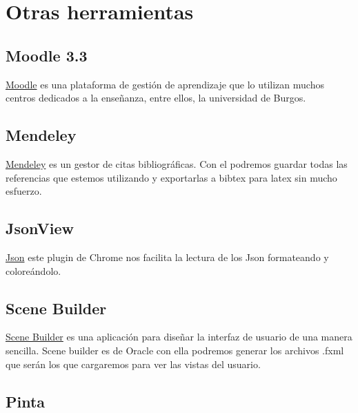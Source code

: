 

\section{Otras herramientas}\label{otras-herramientas}

\subsection{Moodle 3.3}\label{moodle}

\href{https://moodle.org/?lang=es}{Moodle} es una plataforma de gestión de aprendizaje que lo utilizan muchos centros dedicados a la enseñanza, entre ellos, la universidad de Burgos. 

\subsection{Mendeley}\label{mendeley}

\href{https://www.mendeley.com/}{Mendeley} es un gestor de citas bibliográficas. Con el podremos guardar todas las referencias que estemos utilizando y exportarlas a bibtex para latex sin mucho esfuerzo.

\subsection{JsonView}\label{jsonview}

\href{https://chrome.google.com/webstore/detail/jsonview/chklaanhfefbnpoihckbnefhakgolnmc}{Json} este plugin de Chrome nos facilita la lectura de los Json formateando y coloreándolo.

\subsection{Scene Builder}\label{scene-builder}

\href{http://www.oracle.com/technetwork/java/javase/downloads/javafxscenebuilder-info-2157684.html}{Scene Builder} es una aplicación para diseñar la interfaz de usuario de una manera sencilla. Scene builder es de Oracle con ella podremos generar los archivos .fxml que serán los que cargaremos para ver las vistas del usuario.

\subsection{Pinta}\label{pinta}

